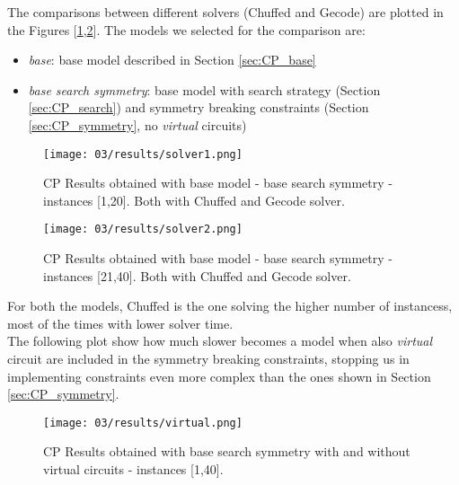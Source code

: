 The comparisons between different solvers (Chuffed and Gecode) are plotted in the Figures [\ref{fig:CP_results_solver1},\ref{fig:CP_results_solver2}].
The models we selected for the comparison are:
\begin{itemize}
  \item \textit{base}: base model described in Section \ref{sec:CP_base}
  \item \textit{base search symmetry}: base model with search strategy (Section \ref{sec:CP_search}) and symmetry breaking constraints (Section \ref{sec:CP_symmetry}, no \textit{virtual} circuits)
\end{itemize}

\begin{figure}[H]
  \centering
  \texttt{[image: 03/results/solver1.png]}
  \caption{
    CP Results obtained with base model - base search symmetry - instances [1,20]. Both with Chuffed and Gecode solver.
  }
  \label{fig:CP_results_solver1}
\end{figure}
\begin{figure}[H]
  \centering
  \texttt{[image: 03/results/solver2.png]}
  \caption{
    CP Results obtained with base model - base search symmetry - instances [21,40]. Both with Chuffed and Gecode solver.
  }
  \label{fig:CP_results_solver2}
\end{figure}

For both the models, Chuffed is the one solving the higher number of instancess,
most of the times with lower solver time.\\

The following plot show how much slower becomes a model when also \textit{virtual}
circuit are included in the symmetry breaking constraints, stopping us in implementing 
constraints even more complex than the ones shown in Section \ref{sec:CP_symmetry}.

\begin{figure}[H]
  \centering
  \texttt{[image: 03/results/virtual.png]}
  \caption{
    CP Results obtained with base search symmetry with and without virtual circuits - instances [1,40].
  }
  \label{fig:CP_results_virtual}
\end{figure}